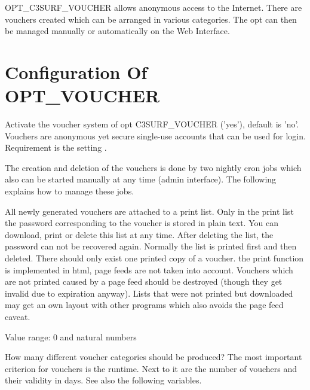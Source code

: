 OPT\_C3SURF\_VOUCHER allows anonymous access to the Internet. There are vouchers
created which can be arranged in various categories. The opt can then be managed manually
or automatically on the Web Interface.

\section {Configuration Of OPT\_VOUCHER}

\begin{description}


  Activate the voucher system of opt C3SURF\_VOUCHER ('yes'), default is 'no'. Vouchers are
  anonymous yet secure single-use accounts that can be used for login.
  Requirement is the setting .

  The creation and deletion of the vouchers is done by two nightly cron jobs which also can
  be started manually at any time (admin interface). The following explains how to manage these jobs.

  All newly generated vouchers are attached to a print list. Only in the print list the password
  corresponding to the voucher is stored in plain text. You can download, print or delete this
  list at any time. After deleting the list, the password can not be recovered again. Normally
  the list is printed first and then deleted. There should only exist one printed copy of a voucher.
  the print function is implemented in html, page feeds are not taken into account. Vouchers which
  are not printed caused by a page feed should be destroyed (though they get invalid due to expiration
  anyway). Lists that were not printed but downloaded may get an own layout with other programs which
  also avoids the page feed caveat.



  Value range: 0 and natural numbers

  How many different voucher categories should be produced? The most important criterion
  for vouchers is the runtime. Next to it are the number of vouchers and their validity in days.
  See also the following variables.



\end{description}
